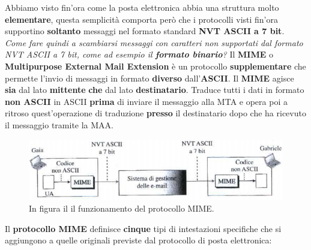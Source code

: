 \documentclass[11pt,a4paper]{article}
\theoremstyle{definition}
\begin{document}
Abbiamo visto fin'ora come la posta elettronica abbia una struttura molto \textbf{elementare}, questa semplicità comporta però che i protocolli visti fin'ora supportino \textbf{soltanto} messaggi nel formato standard\textbf{ NVT ASCII a 7 bit}. \newline\newline
\textit{Come fare quindi a scambiarsi messaggi con caratteri non supportati dal formato NVT ASCII a 7 bit, come ad esempio il \textbf{formato binario}?}
\newpage
Il \textbf{MIME} o \textbf{Multipurpose External Mail Extension} è un protocollo \textbf{supplementare} che permette l'invio di messaggi in formato \textbf{diverso} dall'\textbf{ASCII}. Il \textbf{MIME} agisce \textbf{sia} dal lato \textbf{mittente} \textbf{che} dal lato \textbf{destinatario}. Traduce tutti i dati in formato \textbf{non ASCII} in ASCII \textbf{prima} di inviare il messaggio alla MTA e opera poi a ritroso quest'operazione di traduzione \textbf{presso} il destinatario dopo che ha ricevuto il messaggio tramite la MAA.
\begin{figure}[!h]
	\includegraphics[scale=0.6]{Immagini/MIME.png}
	\centering
	\caption{In figura il il funzionamento del protocollo MIME.}
\end{figure}\newline
Il \textbf{protocollo MIME} definisce \textbf{cinque} tipi di intestazioni specifiche che si aggiungono a quelle originali previste dal protocollo di posta elettronica:
\end{document}
